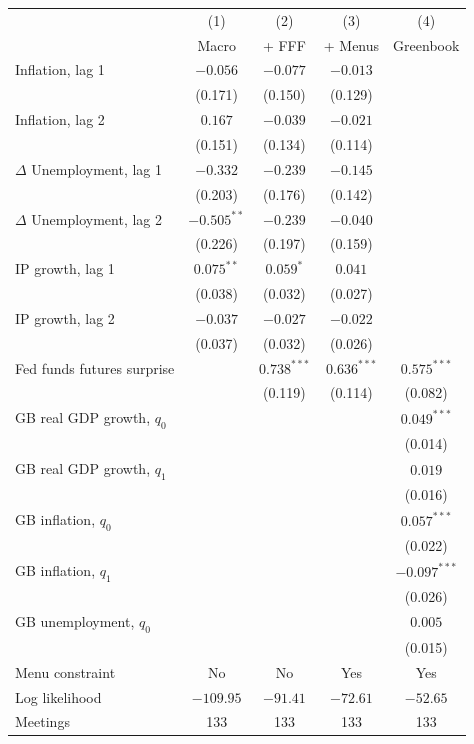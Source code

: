 \begin{tabular}{lcccc}
\toprule
 & (1) & (2) & (3) & (4) \\
 & Macro & + FFF & + Menus & Greenbook \\
\midrule
Inflation, lag 1 & $-0.056$ & $-0.077$ & $-0.013$ &  \\
 & (0.171) & (0.150) & (0.129) &  \\[2pt]
Inflation, lag 2 & $0.167$ & $-0.039$ & $-0.021$ &  \\
 & (0.151) & (0.134) & (0.114) &  \\[2pt]
$\Delta$ Unemployment, lag 1 & $-0.332$ & $-0.239$ & $-0.145$ &  \\
 & (0.203) & (0.176) & (0.142) &  \\[2pt]
$\Delta$ Unemployment, lag 2 & $-0.505^{**}$ & $-0.239$ & $-0.040$ &  \\
 & (0.226) & (0.197) & (0.159) &  \\[2pt]
IP growth, lag 1 & $0.075^{**}$ & $0.059^{*}$ & $0.041$ &  \\
 & (0.038) & (0.032) & (0.027) &  \\[2pt]
IP growth, lag 2 & $-0.037$ & $-0.027$ & $-0.022$ &  \\
 & (0.037) & (0.032) & (0.026) &  \\[2pt]
Fed funds futures surprise &  & $0.738^{***}$ & $0.636^{***}$ & $0.575^{***}$ \\
 &  & (0.119) & (0.114) & (0.082) \\[2pt]
GB real GDP growth, $q_0$ &  &  &  & $0.049^{***}$ \\
 &  &  &  & (0.014) \\[2pt]
GB real GDP growth, $q_1$ &  &  &  & $0.019$ \\
 &  &  &  & (0.016) \\[2pt]
GB inflation, $q_0$ &  &  &  & $0.057^{***}$ \\
 &  &  &  & (0.022) \\[2pt]
GB inflation, $q_1$ &  &  &  & $-0.097^{***}$ \\
 &  &  &  & (0.026) \\[2pt]
GB unemployment, $q_0$ &  &  &  & $0.005$ \\
 &  &  &  & (0.015) \\[2pt]
\midrule
Menu constraint & No & No & Yes & Yes \\
Log likelihood & $-109.95$ & $-91.41$ & $-72.61$ & $-52.65$ \\
Meetings & 133 & 133 & 133 & 133 \\
\bottomrule
\end{tabular}